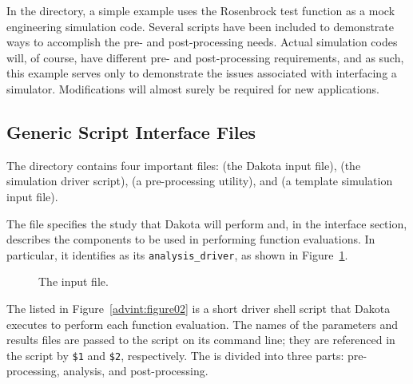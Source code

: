 In the  directory,
a simple example uses the Rosenbrock test function as a mock
engineering simulation code. Several scripts have been included to
demonstrate ways to accomplish the pre- and post-processing
needs. Actual simulation codes will, of course, have different pre-
and post-processing requirements, and as such, this example serves
only to demonstrate the issues associated with interfacing a
simulator. Modifications will almost surely be required for new
applications.

\subsection{Generic Script Interface Files}\label{interfaces:generic}

The 
directory contains four important files:
 (the Dakota input file),
 (the simulation driver script),
 (a pre-processing utility), and
 (a template simulation input file).

The file  specifies the study that
Dakota will perform and, in the interface section, describes the
components to be used in performing function evaluations. In
particular, it identifies  as its
\texttt{analysis\_driver}, as shown in Figure~\ref{advint:figure01}.
\begin{figure}
  \centering
  \begin{bigbox}
    \begin{small}
    \end{small}
  \end{bigbox}
  \caption{The \protect{} input file.}
  \label{advint:figure01}
\end{figure}

The  listed in Figure~\ref{advint:figure02}
is a short driver shell script that Dakota executes to perform each
function evaluation. The names of the parameters and results files are
passed to the script on its command line; they are
referenced in the script by \texttt{\$1}
and \texttt{\$2}, respectively. The 
is divided into three parts: pre-processing, analysis, and post-processing.

